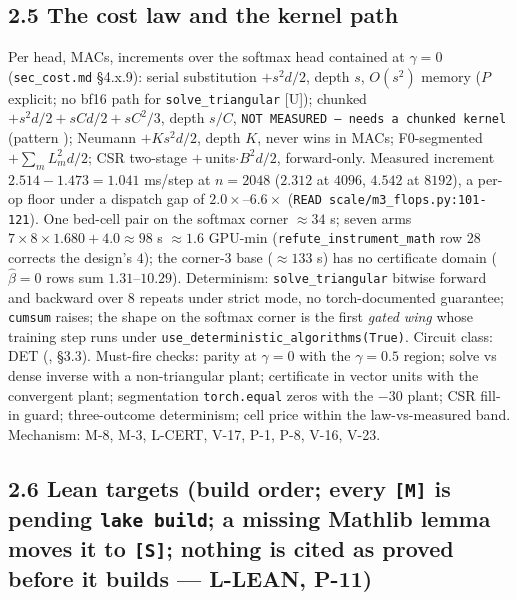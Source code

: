 \documentclass[11pt,a4paper]{article}
\theoremstyle{plain}
\theoremstyle{definition}
\theoremstyle{remark}
\begin{document}
\subsection{2.5 The cost law and the kernel
path}\label{the-cost-law-and-the-kernel-path}

Per head, MACs, increments over the softmax head contained at
\(\gamma=0\) (\texttt{sec\_cost.md} §4.x.9): serial substitution
\(+s^2d/2\), depth \(s\), \(O(s^2)\) memory (\(P\) explicit; no bf16
path for \texttt{solve\_triangular} {[}U{]}); chunked
\(+s^2d/2+sCd/2+sC^2/3\), depth \(s/C\),
\texttt{NOT\ MEASURED\ —\ needs\ a\ chunked\ kernel} (pattern
\citep{yang-2024-deltanet}); Neumann \(+Ks^2d/2\), depth \(K\), never
wins in MACs; F0-segmented \(+\sum_mL_m^2d/2\); CSR two-stage
\(+\,\)units\(\cdot B^2d/2\), forward-only. Measured increment
\(2.514-1.473=1.041\) ms/step at \(n=2048\) (\(2.312\) at \(4096\),
\(4.542\) at \(8192\)), a per-op floor under a dispatch gap of
\(2.0\times\)--\(6.6\times\)
(\texttt{READ\ scale/m3\_flops.py:101-121}). One bed-cell pair on the
softmax corner \(\approx34\) s; seven arms
\(7\times8\times1.680+4.0\approx98\) s \(\approx1.6\) GPU-min
(\texttt{refute\_instrument\_math} row 28 corrects the design's \(4\));
the corner-3 base (\(\approx133\) s) has no certificate domain
(\(\hat\beta=0\) rows sum \(1.31\)--\(10.29\)). Determinism:
\texttt{solve\_triangular} bitwise forward and backward over 8 repeats
under strict mode, no torch-documented guarantee; \texttt{cumsum}
raises; the shape on the softmax corner is the first \emph{gated wing}
whose training step runs under
\texttt{use\_deterministic\_algorithms(True)}. Circuit class: DET
(\citep{cook-1985-taxonomy}, §3.3). Must-fire checks: parity at
\(\gamma=0\) with the \(\gamma=0.5\) region; solve vs dense inverse with
a non-triangular plant; certificate in vector units with the convergent
plant; segmentation \texttt{torch.equal} zeros with the \(-30\) plant;
CSR fill-in guard; three-outcome determinism; cell price within the
law-vs-measured band. Mechanism: M-8, M-3, L-CERT, V-17, P-1, P-8, V-16,
V-23.

\subsection{\texorpdfstring{2.6 Lean targets (build order; every
\texttt{{[}M{]}} is pending \texttt{lake\ build}; a missing Mathlib
lemma moves it to \texttt{{[}S{]}}; nothing is cited as proved before it
builds --- L-LEAN,
P-11)}{2.6 Lean targets (build order; every {[}M{]} is pending lake build; a missing Mathlib lemma moves it to {[}S{]}; nothing is cited as proved before it builds --- L-LEAN, P-11)}}\label{lean-targets-build-order-every-m-is-pending-lake-build-a-missing-mathlib-lemma-moves-it-to-s-nothing-is-cited-as-proved-before-it-builds-l-lean-p-11}
\end{document}
